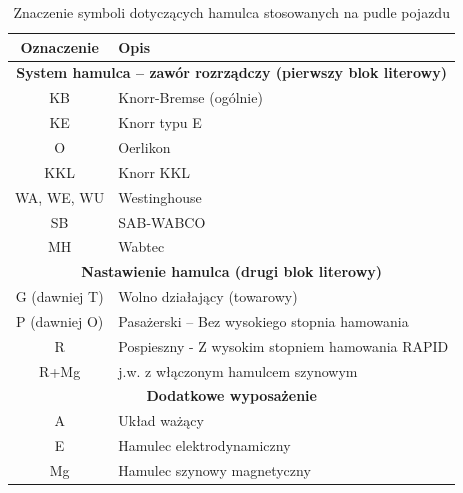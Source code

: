 \begin{table}
	\caption{Znaczenie symboli dotyczących hamulca stosowanych na pudle pojazdu}
	\label{tab:hamulec}
\begin{tabular}{|c|m{8cm}|}
	\hline 
	Oznaczenie&Opis\\ 
	\hline
	\multicolumn{2}{|c|}{\textbf{System hamulca – zawór rozrządczy (pierwszy blok literowy)}} \\
	\hline
	KB & Knorr-Bremse (ogólnie)\\
	\hline
	KE & Knorr typu E\\
	\hline
	O & Oerlikon\\
	\hline
	KKL & Knorr KKL\\
	\hline
	WA, WE, WU & Westinghouse \\
	\hline
	SB & SAB-WABCO\\
	\hline
	MH & Wabtec\\
	\hline
	\multicolumn{2}{|c|}{\textbf{Nastawienie hamulca (drugi blok literowy)}}\\
	\hline
	G (dawniej T) & Wolno działający (towarowy)\\
	\hline
	P (dawniej O) & Pasażerski – Bez wysokiego stopnia hamowania\\
	\hline
	R & Pospieszny - Z wysokim stopniem hamowania RAPID\\
	\hline
	R+Mg & j.w. z włączonym hamulcem szynowym\\
	\hline
	\multicolumn{2}{|c|}{\textbf{Dodatkowe wyposażenie}}\\
	\hline
	A & Układ ważący\\\hline
	E & Hamulec elektrodynamiczny\\
	\hline
	Mg & Hamulec szynowy magnetyczny\\\hline
\end{tabular}
\end{table}
